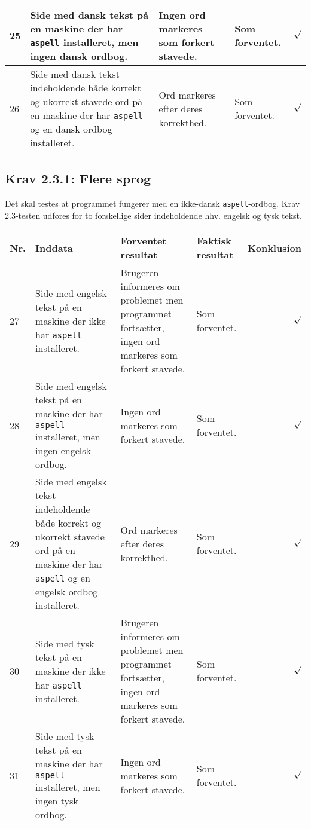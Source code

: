 \documentclass[a4paper,oneside,article]{memoir}
\begin{document}
\begin{landscape}
\begin{longtable}[c]{p{20pt}|p{220pt}|p{130pt}|p{130pt}|r}
25 &
Side med dansk tekst på en maskine der har \texttt{aspell}
installeret, men ingen dansk ordbog. &
Ingen ord markeres som forkert stavede. &
Som forventet. &
$\surd$ \\ \hline

26 &
Side med dansk tekst indeholdende både korrekt og ukorrekt stavede ord
på en maskine der har \texttt{aspell}
og en dansk ordbog installeret. &
Ord markeres efter deres korrekthed. &
Som forventet. &
$\surd$ \\ \hline

\end{longtable}

\subsection{Krav 2.3.1: Flere sprog}

Det skal testes at programmet fungerer med en ikke-dansk
\texttt{aspell}-ordbog. Krav 2.3-testen udføres for to forskellige
sider indeholdende hhv. engelsk og tysk tekst.

\begin{longtable}[c]{p{20pt}|p{220pt}|p{130pt}|p{130pt}|r}
\textbf{Nr.} &
\textbf{Inddata} &
\textbf{Forventet resultat} &
\textbf{Faktisk resultat} &
\textbf{Konklusion} \\ \hline

27 &
Side med engelsk tekst på en maskine der ikke har \texttt{aspell}
installeret. &
Brugeren informeres om problemet men programmet fortsætter, ingen ord
markeres som forkert stavede. &
Som forventet. &
$\surd$ \\ \hline

28 &
Side med engelsk tekst på en maskine der har \texttt{aspell}
installeret, men ingen engelsk ordbog. &
Ingen ord markeres som forkert stavede. &
Som forventet. &
$\surd$ \\ \hline

29 &
Side med engelsk tekst indeholdende både korrekt og ukorrekt stavede ord
på en maskine der har \texttt{aspell} og en engelsk ordbog
installeret. &
Ord markeres efter deres korrekthed. &
Som forventet. &
$\surd$ \\ \hline

30 &
Side med tysk tekst på en maskine der ikke har \texttt{aspell}
installeret. &
Brugeren informeres om problemet men programmet fortsætter, ingen ord
markeres som forkert stavede. &
Som forventet. &
$\surd$ \\ \hline

31 &
Side med tysk tekst på en maskine der har \texttt{aspell}
installeret, men ingen tysk ordbog. &
Ingen ord markeres som forkert stavede. &
Som forventet. &
$\surd$ \\ \hline


\end{longtable}
\end{landscape}
\end{document}
